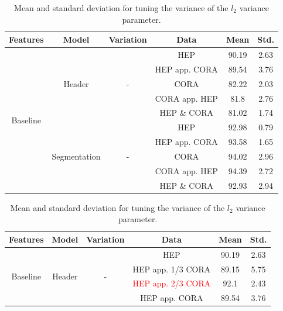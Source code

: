 \begin{table}[t]
\begin{center}
\begin{tabular}{|c|c|c|c|c|c|}
\hline
Features & Model & Variation & Data & Mean & Std.\\
\hline
\multirow{10}{*}{Baseline} & \multirow{5}{*}{Header} & \multirow{5}{*}{-} & HEP & 90.19 & 2.63\\\cline{4-6}
& & & HEP app. CORA & 89.54 & 3.76\\\cline{4-6}
& & & CORA & 82.22 & 2.03\\\cline{4-6}
& & & CORA app. HEP & 81.8 & 2.76\\\cline{4-6}
& & & HEP \& CORA & 81.02 & 1.74\\\cline{2-6}
& \multirow{5}{*}{Segmentation} & \multirow{5}{*}{-} & HEP & 92.98 & 0.79\\\cline{4-6}
& & & HEP app. CORA & 93.58 & 1.65\\\cline{4-6}
& & & CORA & 94.02 & 2.96\\\cline{4-6}
& & & CORA app. HEP & 94.39 & 2.72\\\cline{4-6}
& & & HEP \& CORA & 92.93 & 2.94\\\cline{4-6}
\hline
\end{tabular}
\caption[Mean and standard deviation for tuning the variance of the $l_2$ variance parameter.]{Mean and standard deviation for tuning the variance of the $l_2$ variance parameter.}
\label{table:baselineresults}
\end{center}
\end{table}

\begin{table}[t]
\begin{center}
\begin{tabular}{|c|c|c|c|c|c|}
\hline
Features & Model & Variation & Data & Mean & Std.\\
\hline
\multirow{4}{*}{Baseline} & \multirow{4}{*}{Header} & \multirow{4}{*}{-} & HEP & 90.19 & 2.63\\\cline{4-6}
& & & HEP app. 1/3 CORA & 89.15 & 5.75\\\cline{4-6}
& & & \textcolor{red}{HEP app. 2/3 CORA} & 92.1 & 2.43\\\cline{4-6}
& & & HEP app. CORA & 89.54 & 3.76\\\cline{4-6}
\hline
\end{tabular}
\caption[Mean and standard deviation for tuning the variance of the $l_2$ variance parameter.]{Mean and standard deviation for tuning the variance of the $l_2$ variance parameter.}
\label{table:subsampling}
\end{center}
\end{table}

